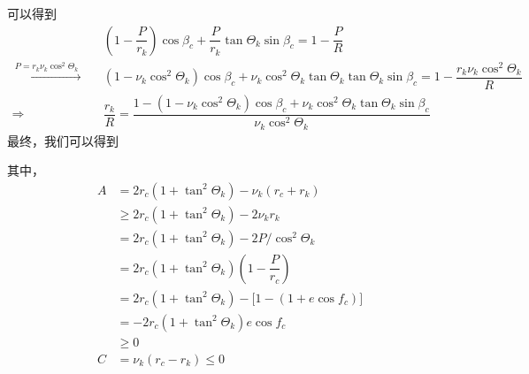 可以得到
\begin{equation*}
	\begin{split}
		&\left(1 - \dfrac{P}{r_k}\right)\cos \beta_c + \dfrac{P}{r_k} \tan \varTheta_k\sin \beta_c = 1 - \dfrac{P}{R}\\[0.5em]
		\xrightarrow{\,\, \textstyle P = r_k\nu_k\cos^2 \varTheta_k\,\,}\quad & (1-\nu_k \cos^2 \varTheta_k)\cos \beta_c + \nu_k \cos^2 \varTheta_k\tan \varTheta_k \tan \varTheta_k \sin \beta_c = 1 - \dfrac{r_k \nu_k \cos^2 \varTheta_k}{R}\\[0.5em]
		\Rightarrow \quad & \dfrac{r_k}{R} = \dfrac{1 - (1-\nu_k\cos^2 \varTheta_k) \cos \beta_c + \nu_k \cos^2 \varTheta_k\tan\varTheta_k\sin \beta_c}{\nu_k \cos^2 \varTheta_k}
	\end{split}
\end{equation*}
最终，我们可以得到

其中，
\begin{equation*}
	\begin{split}
		A &= 2r_c \left(1 + \tan^2 \varTheta_k\right) - \nu_k (r_c + r_k) \\
		& \ge 2r_c \left(1 + \tan^2 \varTheta_k\right) -2 \nu_k r_k \\
		& = 2r_c \left(1 + \tan^2 \varTheta_k\right) -2P/\cos^2 \varTheta_k \\
		& = 2r_c \left(1 + \tan^2 \varTheta_k\right) \left(1 - \dfrac{P}{r_c}\right)\\
		& = 2r_c \left(1 + \tan^2 \varTheta_k\right) -\big[1 - (1 + e\cos f_c)\big]\\
		& = -2r_c \left(1 + \tan^2 \varTheta_k\right)e \cos f_c\\
		& \ge 0\\
		C &=  \nu_k (r_c - r_k) \le 0
	\end{split}
\end{equation*}

